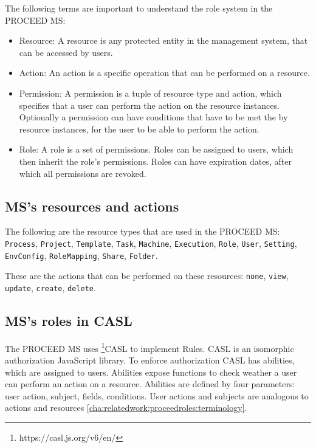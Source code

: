 The following terms are important to understand the role system in the PROCEED MS:

\begin{itemize}
  \item Resource: A resource is any protected entity in the management system, that can be
    accessed by users.
  \item Action: An action is a specific operation that can be performed on a resource.
  \item Permission: A permission is a tuple of resource type and action, which specifies that a
    user can perform the action on the resource instances. Optionally a permission can have
    conditions that have to be met the by resource instances, for the user to be able to perform the action.
  \item Role: A role is a set of permissions. Roles can be assigned to users, which then
    inherit the role's permissions. Roles can have expiration dates, after which all
    permissions are revoked.
\end{itemize}

\subsection{MS's resources and actions}
\label{cha:relatedwork:proceedroles:ms-resources-actions}

The following are the resource types that are used in the PROCEED MS:
  \lstinline{Process}, 
  \lstinline{Project},
  \lstinline{Template},
  \lstinline{Task},
  \lstinline{Machine},
  \lstinline{Execution},
  \lstinline{Role},
  \lstinline{User},
  \lstinline{Setting},
  \lstinline{EnvConfig},
  \lstinline{RoleMapping},
  \lstinline{Share},
  \lstinline{Folder}.

These are the actions that can be performed on these resources:
  \lstinline{none},
  \lstinline{view},
  \lstinline{update},
  \lstinline{create},
  \lstinline{delete}.

\subsection{MS's roles in CASL}
\label{cha:relatedwork:proceedroles:casl}

The PROCEED MS uses \footnote{https://casl.js.org/v6/en/}{CASL} to implement Rules. CASL
is an isomorphic authorization JavaScript library.
To enforce authorization CASL has abilities, which are assigned to users.
Abilities expose functions to check weather a user can perform an action on a resource.
Abilities are defined by four parameters: user action, subject, fields, conditions.
User actions and subjects are analogous to actions and resources \ref{cha:relatedwork:proceedroles:terminology}.

